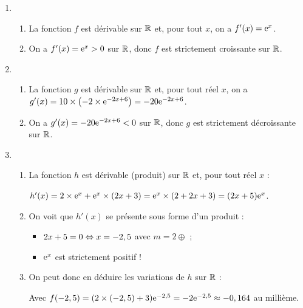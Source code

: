 \documentclass[a4paper,11pt]{article}
\begin{document}
\medskip


\smallskip

\begin{enumerate}
	\item 
	\begin{enumerate}
		\item La fonction $f$ est dérivable sur $\R$ et, pour tout $x$, on a $f'(x)={\rm e}^x$.
		\item On a $f'(x)={\rm e}^x >0$ sur $\R$, donc $f$ est strictement croissante sur $\R$.
	\end{enumerate}
	\item 
	\begin{enumerate}
		\item La fonction $g$ est dérivable sur $\R$ et, pour tout réel $x$, on a $g'(x)=10 \times \left(-2 \times {\rm e}^{-2x+6} \right) = -20 {\rm e}^{-2x+6}$.
		\item On a $g'(x)=-20 {\rm e}^{-2x+6} <0$ sur $\R$, donc $g$ est strictement décroissante sur $\R$.
	\end{enumerate}
	\item 
	\begin{enumerate}
		\item La fonction $h$ est dérivable (produit) sur $\R$ et, pour tout réel $x$ :
		
		\hspace{0.5cm}$h'(x)=2\times {\rm e}^x + {\rm e}^x \times (2x+3)={\rm e}^x \times (2+2x+3) = (2x+5){\rm e}^x$.
		\item On voit que $h'(x)$ se présente sous forme d'un produit :
		\begin{itemize}
			\item $2x+5=0 \Leftrightarrow x=-2,5$ avec $m=2 \oplus$ ;
			\item ${\rm e}^x$ est strictement positif !
		\end{itemize}
		\begin{center}
		\end{center}
		\item On peut donc en déduire les variations de $h$ sur $\R$ :
		\begin{center}
		
			Avec $f(-2,5) = (2 \times (-2,5) + 3) {\rm e}^{-2,5} = -2{\rm e}^{-2,5} \approx -0,164$ au millième.
		\end{center}
	\end{enumerate}
\end{enumerate}
\end{document}
